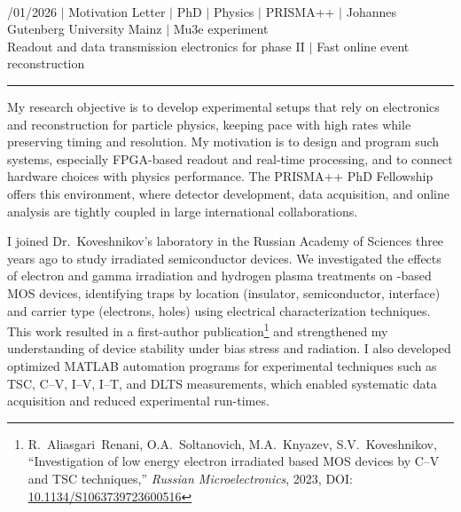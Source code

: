 \documentclass[a4paper,12pt]{article}
\begin{document}
{\centering
  {\scshape {}} \\ 
  {\fontsize{10}{10}/01/2026} $|$
  {\fontsize{10}{10}\selectfont Motivation Letter} $|$
  {\fontsize{10}{10}\selectfont PhD} $|$
  {\fontsize{10}{10}\selectfont Physics} $|$
  {\fontsize{10}{10}\selectfont PRISMA++} $|$
  {\fontsize{10}{10}\selectfont Johannes Gutenberg University Mainz} $|$
  {\fontsize{10}{10}\selectfont Mu3e experiment} \\
  {\fontsize{10}{10}\selectfont Readout and data transmission electronics for phase II} $|$
  {\fontsize{10}{10}\selectfont Fast online event reconstruction}
\par}
\vspace{-15pt}
\noindent\rule{\textwidth}{0.5pt}

\vspace{-5pt}

My research objective is to develop experimental setups that rely on electronics and reconstruction for particle physics, keeping pace with high rates while preserving timing and resolution. My motivation is to design and program such systems, especially FPGA-based readout and real-time processing, and to connect hardware choices with physics performance. The PRISMA++ PhD Fellowship offers this environment, where detector development, data acquisition, and online analysis are tightly coupled in large international collaborations.

I joined Dr.\ Koveshnikov's laboratory in the Russian Academy of Sciences three years ago to study irradiated semiconductor devices. We investigated the effects of electron and gamma irradiation and hydrogen plasma treatments on -based MOS devices, identifying traps by location (insulator, semiconductor, interface) and carrier type (electrons, holes) using electrical characterization techniques. This work resulted in a first-author publication\footnote{R.~Aliasgari~Renani, O.A.~Soltanovich, M.A.~Knyazev, S.V.~Koveshnikov, ``Investigation of low energy electron irradiated  based MOS devices by C--V and TSC techniques,'' \textit{Russian Microelectronics}, 2023, DOI: \href{https://doi.org/10.1134/S1063739723600516}{10.1134/S1063739723600516}} and strengthened my understanding of device stability under bias stress and radiation. I also developed optimized MATLAB automation programs for experimental techniques such as TSC, C--V, I--V, I--T, and DLTS measurements, which enabled systematic data acquisition and reduced experimental run-times.
\end{document}
